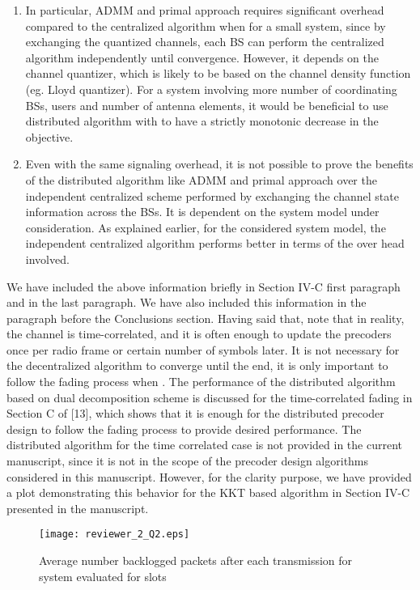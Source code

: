 \begin{enumerate}
\begin{enumerate}
		\item In particular, \ac{ADMM} and primal approach requires significant overhead compared to the centralized algorithm when  for a small system, since by exchanging the quantized channels, each \ac{BS} can perform the centralized algorithm independently until convergence. However, it depends on the channel quantizer, which is likely to be based on the channel density function (eg. Lloyd quantizer). For a system involving more number of coordinating \acp{BS}, users and number of antenna elements, it would be beneficial to use distributed algorithm with  to have a strictly monotonic decrease in the objective.
		\item Even with the same signaling overhead, it is not possible to prove the benefits of the distributed algorithm like \ac{ADMM} and primal approach over the independent centralized scheme performed by exchanging the channel state information across the \acp{BS}. It is dependent on the system model under consideration. As explained earlier, for the considered system model, the independent centralized algorithm performs better in terms of the over head involved. 
	\end{enumerate}
	
	We have included the above information briefly in Section IV-C first paragraph and in the last paragraph. We have also included this information in the paragraph before the Conclusions section. Having said that, note that in reality, the channel is time-correlated, and it is often enough to update the precoders once per radio frame or certain number of symbols later. It is not necessary for the decentralized algorithm to converge until the end, it is only important to follow the fading process when . The performance of the distributed algorithm based on dual decomposition scheme is discussed for the time-correlated fading in Section C of [13], which shows that it is enough for the distributed precoder design to follow the fading process to provide desired performance. The distributed algorithm for the time correlated case is not provided in the current manuscript, since it is not in the scope of the precoder design algorithms considered in this manuscript. However, for the clarity purpose, we have provided a plot demonstrating this behavior for the \ac{KKT} based algorithm in Section IV-C presented in the manuscript.
	\begin{figure}[h!]
		\centering
		\texttt{[image: reviewer\_2\_Q2.eps]}
		\caption{Average number backlogged packets after each transmission for system  evaluated for  slots}
		\label{fig-review-2}
	\end{figure}
		

\end{enumerate}
